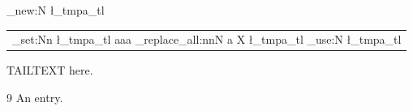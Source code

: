 \documentclass{article}
\begin{document}
\ExplSyntaxOn
\tl_new:N \l_tmpa_tl
\newcommand\myop{\tl_set:Nn \l_tmpa_tl {aaa}
  \regex_replace_all:nnN {a} {X} \l_tmpa_tl \tl_use:N \l_tmpa_tl}
\ExplSyntaxOff
\begin{tabular}{p{3cm}}
\myop \\
\end{tabular}
TAILTEXT here.
\begin{thebibliography}{9} An entry.\end{thebibliography}
\end{document}
